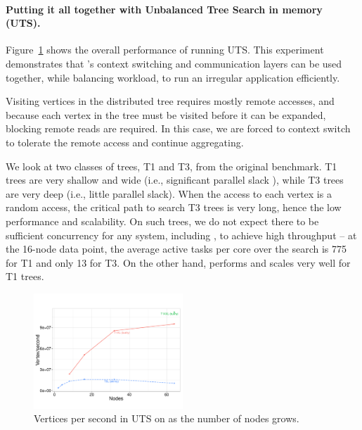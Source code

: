 
\paragraph{Putting it all together with Unbalanced Tree Search in memory
(UTS).} 
Figure~\ref{fig:grappa-uts} shows the overall performance of \Grappa running
UTS. This experiment demonstrates that \Grappa's context
switching and communication layers can be used together, while
balancing workload, to run an irregular application efficiently. 

Visiting vertices in the distributed tree requires mostly remote
accesses, and because each vertex in the tree must be visited before
it can be expanded, blocking remote reads are required. In this case,
we are forced to context switch to tolerate the remote access and
continue aggregating.

We look at two classes of trees, T1 and T3, from
the original benchmark. T1 trees are very shallow and wide (i.e., significant
parallel slack ), while T3 trees are very deep (i.e., little parallel slack).
When the access to each vertex is a random access, the critical path to search
T3 trees is very long, hence the low performance and scalability. On such
trees, we do not expect there to be sufficient concurrency for any system,
including \Grappa, to achieve high throughput -- at the 16-node data point,
the average active tasks per core over the search is 775 for T1 and
only 13 for T3.
On the other hand, \Grappa performs and scales very well for T1
trees.


\begin{figure}[ht]
    \begin{center}
      \includegraphics[width=0.5\textwidth]{figs/uts_scale.pdf}
    \end{center}
    \caption{Vertices per second in UTS on \Grappa as the number of nodes grows.}
    \label{fig:grappa-uts}
\end{figure}

